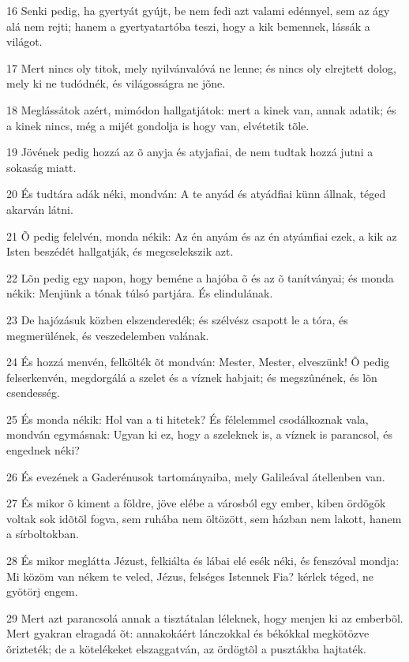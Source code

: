 \par 16 Senki pedig, ha gyertyát gyújt, be nem fedi azt valami edénnyel, sem az ágy alá nem rejti; hanem a gyertyatartóba teszi, hogy a kik bemennek, lássák a világot.
\par 17 Mert nincs oly titok, mely nyilvánvalóvá ne lenne; és nincs oly elrejtett dolog, mely ki ne tudódnék, és világosságra ne jõne.
\par 18 Meglássátok azért, mimódon hallgatjátok: mert a kinek van, annak adatik; és a kinek nincs, még a mijét gondolja is hogy van, elvétetik tõle.
\par 19 Jövének pedig hozzá az õ anyja és atyjafiai, de nem tudtak hozzá jutni a sokaság miatt.
\par 20 És tudtára adák néki, mondván: A te anyád és atyádfiai künn állnak, téged akarván látni.
\par 21 Õ pedig felelvén, monda nékik: Az én anyám és az én atyámfiai ezek, a kik az Isten beszédét hallgatják, és megcselekszik azt.
\par 22 Lõn pedig egy napon, hogy beméne a hajóba õ és az õ tanítványai; és monda nékik: Menjünk a tónak túlsó partjára. És elindulának.
\par 23 De hajózásuk közben elszenderedék; és szélvész csapott le a tóra, és megmerülének, és veszedelemben valának.
\par 24 És hozzá menvén, felkölték õt mondván: Mester, Mester, elveszünk! Õ pedig felserkenvén, megdorgálá a szelet és a víznek habjait; és megszûnének, és lõn csendesség.
\par 25 És monda nékik: Hol van a ti hitetek? És félelemmel csodálkoznak vala, mondván egymásnak: Ugyan ki ez, hogy a szeleknek is, a víznek is parancsol, és engednek néki?
\par 26 És evezének a Gaderénusok tartományaiba, mely Galileával átellenben van.
\par 27 És mikor õ kiment a földre, jöve elébe a városból egy ember, kiben ördögök voltak sok idõtõl fogva, sem ruhába nem öltözött, sem házban nem lakott, hanem a sírboltokban.
\par 28 És mikor meglátta Jézust, felkiálta és lábai elé esék néki, és fenszóval mondja: Mi közöm van nékem te veled, Jézus, felséges Istennek Fia? kérlek téged, ne gyötörj engem.
\par 29 Mert azt parancsolá annak a tisztátalan léleknek, hogy menjen ki az emberbõl. Mert gyakran elragadá õt: annakokáért lánczokkal és békókkal megkötözve õrizteték; de a kötelékeket elszaggatván, az ördögtõl a pusztákba hajtaték.
